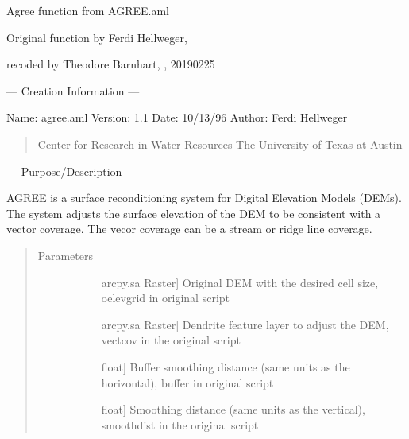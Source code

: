 \documentclass[letterpaper,10pt,english]{sphinxmanual}
\begin{document}

\begin{fulllineitems}
\label{\detokenize{make_hydrodem:make_hydrodem.agree}}
Agree function from AGREE.aml

Original function by Ferdi Hellweger, 

recoded by Theodore Barnhart, , 20190225

— Creation Information —

Name: agree.aml
Version: 1.1
Date: 10/13/96
Author: Ferdi Hellweger
\begin{quote}

Center for Research in Water Resources
The University of Texas at Austin
\end{quote}

— Purpose/Description —

AGREE is a surface reconditioning system for Digital Elevation Models (DEMs).
The system adjusts the surface elevation of the DEM to be consistent with a
vector coverage.  The vecor coverage can be a stream or ridge line coverage.
\begin{quote}\begin{description}
\item[{Parameters}] \leavevmode\begin{description}
\item[{}] \leavevmode{[}arcpy.sa Raster{]}
Original DEM with the desired cell size, oelevgrid in original script

\item[{}] \leavevmode{[}arcpy.sa Raster{]}
Dendrite feature layer to adjust the DEM, vectcov in the original script

\item[{}] \leavevmode{[}float{]}
Buffer smoothing distance (same units as the horizontal), buffer in original script

\item[{}] \leavevmode{[}float{]}
Smoothing distance (same units as the vertical), smoothdist in the original script


\end{description}
\end{description}
\end{quote}
\end{fulllineitems}
\end{document}
